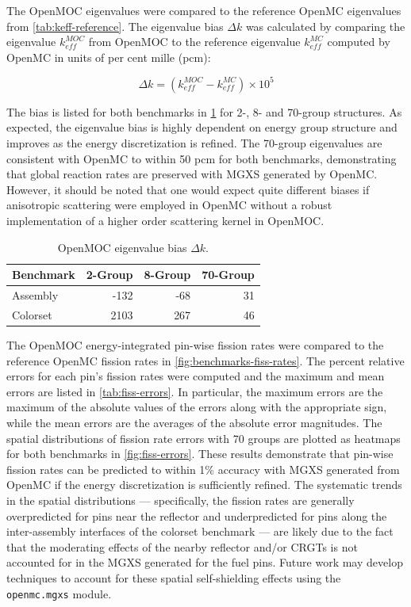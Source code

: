The OpenMOC eigenvalues were compared to the reference OpenMC eigenvalues from \cref{tab:keff-reference}. The eigenvalue bias $\Delta k$ was calculated by comparing the eigenvalue $k_{eff}^{MOC}$ from OpenMOC to the reference eigenvalue $k_{eff}^{MC}$ computed by OpenMC in units of per cent mille (pcm):

\begin{equation}
\label{eqn:delta-rho}
\Delta k = \left(k_{eff}^{MOC} - k_{eff}^{MC}\right) \times 10^{5}
\end{equation}

The bias is listed for both benchmarks in \cref{tab:keff-bias} for 2-, 8- and 70-group structures. As expected, the eigenvalue bias is highly dependent on energy group structure and improves as the energy discretization is refined. The 70-group eigenvalues are consistent with OpenMC to within 50 pcm for both benchmarks, demonstrating that global reaction rates are preserved with MGXS generated by OpenMC. However, it should be noted that one would expect quite different biases if anisotropic scattering were employed in OpenMC without a robust implementation of a higher order scattering kernel in OpenMOC.

\begin{table}[h!]
  \centering
  \caption{OpenMOC eigenvalue bias $\Delta k$.}
  \label{tab:keff-bias}
  \begin{tabular}{l r r r}
  \toprule
  \textbf{Benchmark} & \textbf{2-Group} & \textbf{8-Group} & \textbf{70-Group} \\
  \midrule
  Assembly & -132 & -68 & 31 \\
  \midrule
  Colorset & 2103 & 267 & 46 \\
  \bottomrule
\end{tabular}
\end{table}

The OpenMOC energy-integrated pin-wise fission rates were compared to the reference OpenMC fission rates in \cref{fig:benchmarks-fiss-rates}. The percent relative errors for each pin's fission rates were computed and the maximum and mean errors are listed in \cref{tab:fiss-errors}. In particular, the maximum errors are the maximum of the absolute values of the errors along with the appropriate sign, while the mean errors are the averages of the absolute error magnitudes. The spatial distributions of fission rate errors with 70 groups are plotted as heatmaps for both benchmarks in \cref{fig:fiss-errors}. These results demonstrate that pin-wise fission rates can be predicted to within 1\% accuracy with MGXS generated from OpenMC if the energy discretization is sufficiently refined. The systematic trends in the spatial distributions --- specifically, the fission rates are generally overpredicted for pins near the reflector and underpredicted for pins along the inter-assembly interfaces of the colorset benchmark --- are likely due to the fact that the moderating effects of the nearby reflector and/or CRGTs is not accounted for in the MGXS generated for the fuel pins. Future work may develop techniques to account for these spatial self-shielding effects using the \texttt{openmc.mgxs} module.

